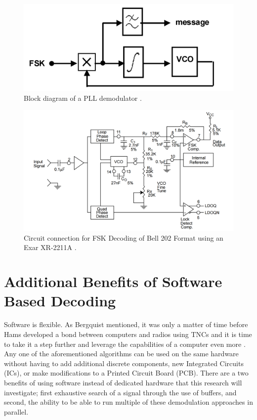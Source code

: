\begin{figure}
  \centering
	\includegraphics[width=0.75\linewidth]{images/PLLBlockDiagram.PNG} 
	\caption{Block diagram of a PLL demodulator \cite{Roppel}.}
   \label{PLLBlockDiagram}
\end{figure}
\begin{figure}
  \centering
	\includegraphics[width=0.75\linewidth]{images/XR2211Circuit.PNG} 
	\caption{Circuit connection for FSK Decoding of Bell 202 Format using an Exar XR-2211A \cite{EXAR1997}.}
   \label{XR2211Circuit}
\end{figure}

\section{Additional Benefits of Software Based Decoding}
Software is flexible. As Bergquist mentioned, it was only a matter of time before Hams developed a bond between computers and radios using TNCs and it is time to take it a step further and leverage the capabilities of a computer even more \cite{Bergquist2001}. Any one of the aforementioned algorithms can be used on the same hardware without having to add additional discrete components, new Integrated Circuits (ICs), or make modifications to a Printed Circuit Board (PCB). There are a two benefits of using software instead of dedicated hardware that this research will investigate; first exhaustive search of a signal through the use of buffers, and second, the ability to be able to run multiple of these demodulation approaches in parallel.

